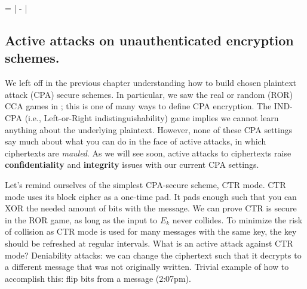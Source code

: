 
\bnm
\AdvSTPRP{\tweakCipher}{\advA} = \left| -
                                     \right|
\enm

\subsection{Active attacks on unauthenticated encryption schemes.}
We left off in the previous chapter understanding how to build chosen plaintext attack (CPA) secure schemes. In particular, we saw the real or random (ROR) CCA games in ; this is one of many ways to define CPA encryption.
The IND-CPA (i.e., Left-or-Right indistinguishability) game implies we cannot learn anything about the underlying plaintext.
However, none of these CPA settings say much about what you can do in the face of active attacks, in which ciphertexts are \emph{mauled}. As we will see soon, active attacks to ciphertexts raise {\bf confidentiality} and {\bf integrity} issues with our current CPA settings.

Let's remind ourselves of the simplest CPA-secure scheme, CTR mode.
CTR mode uses its block cipher as a one-time pad. It pads enough such that you can XOR the needed amount of bits with the message. We can prove CTR is secure in the ROR game, as long as the input to $E_k$ never collides. To minimize the risk of collision as CTR mode is used for many messages with the same key, the key should be refreshed at regular intervals.
What is an active attack against CTR mode? Deniability attacks: we can change the ciphertext such that it decrypts to a different message that was not originally written. Trivial example of how to accomplish this: flip bits from a message (2:07pm).


